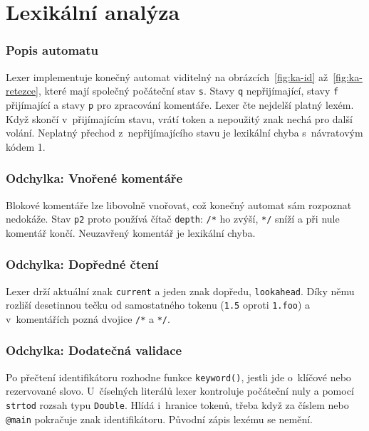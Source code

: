 \section{Lexikální analýza}\label{sec:lexer}

\subsubsection*{Popis automatu}
Lexer implementuje konečný automat viditelný na obrázcích~\ref{fig:ka-id}
až~\ref{fig:ka-retezce}, které mají společný počáteční stav \texttt{s}.
Stavy \texttt{q} nepřijímající, stavy \texttt{f} přijímající a stavy
\texttt{p} pro zpracování komentáře. Lexer čte nejdelší platný lexém. Když
skončí v~přijímajícím stavu, vrátí token a nepoužitý znak nechá pro další
volání. Neplatný přechod z~nepřijímajícího stavu je lexikální chyba
s~návratovým kódem 1.

\subsubsection*{Odchylka: Vnořené komentáře}
Blokové komentáře lze libovolně vnořovat, což konečný automat sám rozpoznat
nedokáže. Stav \texttt{p2} proto používá čítač \texttt{depth}: \texttt{/*} ho
zvýší, \texttt{*/} sníží a při nule komentář končí. Neuzavřený komentář je
lexikální chyba.

\subsubsection*{Odchylka: Dopředné čtení}
Lexer drží aktuální znak \texttt{current} a jeden znak dopředu,
\texttt{lookahead}. Díky němu rozliší desetinnou tečku od samostatného tokenu
(\texttt{1.5} oproti \texttt{1.foo}) a v~komentářích pozná dvojice
\texttt{/*} a \texttt{*/}.

\subsubsection*{Odchylka: Dodatečná validace}
Po přečtení identifikátoru rozhodne funkce \texttt{keyword()}, jestli jde
o~klíčové nebo rezervované slovo. U~číselných literálů lexer kontroluje
počáteční nuly a pomocí \texttt{strtod} rozsah typu \texttt{Double}. Hlídá
i~hranice tokenů, třeba když za číslem nebo \texttt{@main} pokračuje znak
identifikátoru. Původní zápis lexému se nemění.

